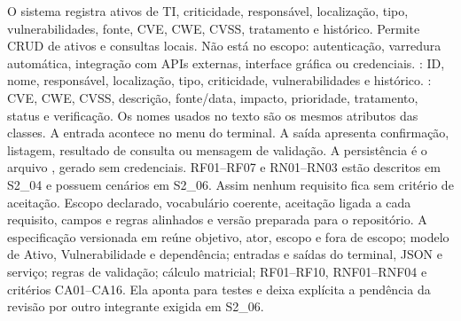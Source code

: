 
 O sistema registra ativos de TI, criticidade, responsável, localização, tipo, vulnerabilidades, fonte, CVE, CWE, CVSS, tratamento e histórico. Permite CRUD de ativos e consultas locais. Não está no escopo: autenticação, varredura automática, integração com APIs externas, interface gráfica ou credenciais.
 : ID, nome, responsável, localização, tipo, criticidade, vulnerabilidades e histórico. : CVE, CWE, CVSS, descrição, fonte/data, impacto, prioridade, tratamento, status e verificação. Os nomes usados no texto são os mesmos atributos das classes.
 A entrada acontece no menu do terminal. A saída apresenta confirmação, listagem, resultado de consulta ou mensagem de validação. A persistência é o arquivo , gerado sem credenciais.
 RF01--RF07 e RN01--RN03 estão descritos em S2\_04 e possuem cenários em S2\_06. Assim nenhum requisito fica sem critério de aceitação.
 Escopo declarado, vocabulário coerente, aceitação ligada a cada requisito, campos e regras alinhados e versão preparada para o repositório.
 A especificação versionada em  reúne objetivo, ator, escopo e fora de escopo; modelo de Ativo, Vulnerabilidade e dependência; entradas e saídas do terminal, JSON e serviço; regras de validação; cálculo matricial; RF01--RF10, RNF01--RNF04 e critérios CA01--CA16. Ela aponta para testes e deixa explícita a pendência da revisão por outro integrante exigida em S2\_06.

